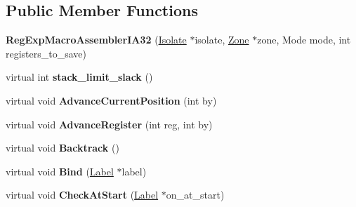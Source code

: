 \subsection*{Public Member Functions}
\begin{DoxyCompactItemize}
\item 
{\bfseries Reg\+Exp\+Macro\+Assembler\+I\+A32} (\hyperlink{classv8_1_1internal_1_1_isolate}{Isolate} $\ast$isolate, \hyperlink{classv8_1_1internal_1_1_zone}{Zone} $\ast$zone, Mode mode, int registers\+\_\+to\+\_\+save)\hypertarget{classv8_1_1internal_1_1_reg_exp_macro_assembler_i_a32_acfcd0b7e094e612cbc8e1737858e2364}{}\label{classv8_1_1internal_1_1_reg_exp_macro_assembler_i_a32_acfcd0b7e094e612cbc8e1737858e2364}

\item 
virtual int {\bfseries stack\+\_\+limit\+\_\+slack} ()\hypertarget{classv8_1_1internal_1_1_reg_exp_macro_assembler_i_a32_ad96cfd439f89c5a5344abe800ba067b3}{}\label{classv8_1_1internal_1_1_reg_exp_macro_assembler_i_a32_ad96cfd439f89c5a5344abe800ba067b3}

\item 
virtual void {\bfseries Advance\+Current\+Position} (int by)\hypertarget{classv8_1_1internal_1_1_reg_exp_macro_assembler_i_a32_a916b914594f580c9d2be0529b45e6119}{}\label{classv8_1_1internal_1_1_reg_exp_macro_assembler_i_a32_a916b914594f580c9d2be0529b45e6119}

\item 
virtual void {\bfseries Advance\+Register} (int reg, int by)\hypertarget{classv8_1_1internal_1_1_reg_exp_macro_assembler_i_a32_adbd3b2736d3ec8c485d27bec5d8d036f}{}\label{classv8_1_1internal_1_1_reg_exp_macro_assembler_i_a32_adbd3b2736d3ec8c485d27bec5d8d036f}

\item 
virtual void {\bfseries Backtrack} ()\hypertarget{classv8_1_1internal_1_1_reg_exp_macro_assembler_i_a32_a35ce7638883eef399d53c7762255f881}{}\label{classv8_1_1internal_1_1_reg_exp_macro_assembler_i_a32_a35ce7638883eef399d53c7762255f881}

\item 
virtual void {\bfseries Bind} (\hyperlink{classv8_1_1internal_1_1_label}{Label} $\ast$label)\hypertarget{classv8_1_1internal_1_1_reg_exp_macro_assembler_i_a32_a94397279fdc1f7bbaf8d93d843f8c575}{}\label{classv8_1_1internal_1_1_reg_exp_macro_assembler_i_a32_a94397279fdc1f7bbaf8d93d843f8c575}

\item 
virtual void {\bfseries Check\+At\+Start} (\hyperlink{classv8_1_1internal_1_1_label}{Label} $\ast$on\+\_\+at\+\_\+start)\hypertarget{classv8_1_1internal_1_1_reg_exp_macro_assembler_i_a32_a9ee06138571bafc6d9d9b8595faa6f4e}{}\label{classv8_1_1internal_1_1_reg_exp_macro_assembler_i_a32_a9ee06138571bafc6d9d9b8595faa6f4e}


\end{DoxyCompactItemize}
